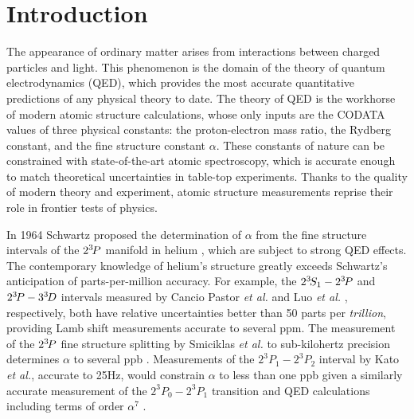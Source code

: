 

\section{Introduction}

  {The} appearance of ordinary matter arises from interactions between charged particles and light.
	This phenomenon is the domain of the theory of quantum electrodynamics (QED), which provides the most accurate quantitative predictions of any physical theory to date.
	The theory of QED is the workhorse of modern atomic structure calculations, whose only inputs are the CODATA values of three physical constants: the proton-electron mass ratio, the Rydberg constant, and the fine structure constant $\alpha$.
	These constants of nature can be constrained with state-of-the-art atomic spectroscopy, which is accurate enough to match theoretical uncertainties in table-top experiments.
	Thanks to the quality of modern theory and experiment, atomic structure measurements reprise their role in frontier tests of physics.
	

  In 1964 Schwartz proposed the determination of $\alpha$ from the fine structure intervals of the $2^{3\!} P$ manifold in helium \cite{Schwartz64}, which are subject to strong QED effects.
	The contemporary knowledge of helium's structure greatly exceeds Schwartz's anticipation of parts-per-million accuracy.
	For example, the $2^{3\!} S_1 - 2^{3\!} P$ and $2^{3\!} P - 3^{3\!} D$ intervals measured by Cancio Pastor \textit{et al.} \cite{Pastor04} and Luo \emph{et al.} \cite{Luo16}, respectively, both have relative uncertainties better than 50 parts per \emph{trillion}, providing Lamb shift measurements accurate to several ppm.
	The measurement of the $2^{3\!}P$ fine structure splitting by Smiciklas \textit{et al.} to sub-kilohertz precision determines $\alpha$ to several ppb \cite{Smiciklas10}.
	Measurements of the $2^{3\!}P_1-2^{3\!}P_2$ interval by Kato \emph{et al.}, accurate to 25Hz, would constrain $\alpha$ to less than one ppb given a similarly accurate measurement of the $2^{3\!}P_0 - 2^{3\!}P_1$ transition and QED calculations including terms of order $\alpha^7$ \cite{Kato18}.
	

